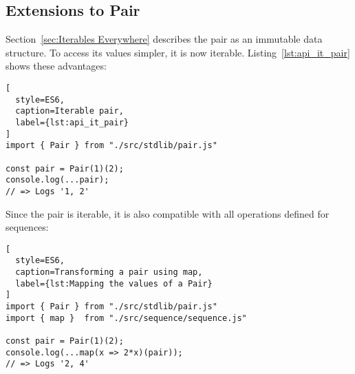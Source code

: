 \subsection{Extensions to Pair} %
\label{sub:Extensions to Pair}
Section~\ref{sec:Iterables Everywhere} describes the pair as an immutable
data structure. To access its values simpler, it is now iterable.
Listing~\ref{lst:api_it_pair} shows these advantages:

\begin{lstlisting}[
  style=ES6,
  caption=Iterable pair,
  label={lst:api_it_pair}
]
import { Pair } from "./src/stdlib/pair.js"

const pair = Pair(1)(2);
console.log(...pair);
// => Logs '1, 2'
\end{lstlisting}

Since the pair is iterable, it is also compatible with all operations defined
for sequences:

\begin{lstlisting}[
  style=ES6,
  caption=Transforming a pair using map,
  label={lst:Mapping the values of a Pair}
]
import { Pair } from "./src/stdlib/pair.js"
import { map }  from "./src/sequence/sequence.js"

const pair = Pair(1)(2);
console.log(...map(x => 2*x)(pair));
// => Logs '2, 4'
\end{lstlisting}


